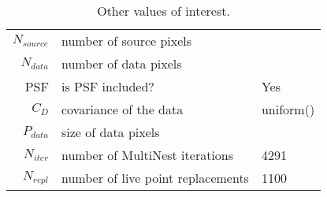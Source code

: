\begin{table*}[!htb]\caption{Other values of interest.}\begin{center}\begin{tabular}{ r l l }\hline $N_{source}$ & number of source pixels           &  \\ 
 $N_{data}$   & number of data pixels             &  \\ 
 PSF & is PSF included?                          & Yes \\
 $C_D$        & covariance of the data            & uniform() \\ 
 $P_{data}$   & size of data pixels               &  \\ 
 $N_{iter}$   & number of MultiNest iterations    & 4291 \\ 
 $N_{repl}$   & number of live point replacements & 1100 \\ 
\hline\end{tabular}\end{center}\label{tab:3}\end{table*}